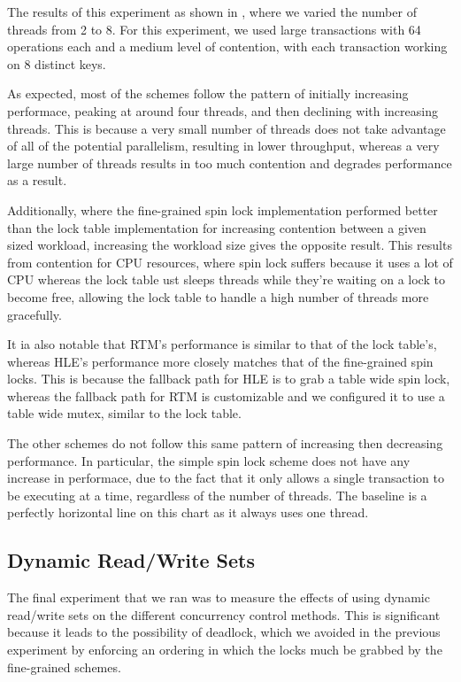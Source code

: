 The results of this experiment as shown in , where we varied the number 
of threads from 2 to 8. For this experiment, we used large transactions with 64 
operations each and a medium level of contention, with each transaction working on 
8 distinct keys.

As expected, most of the schemes follow the pattern of initially increasing performace, 
peaking at around four threads, and then declining with increasing threads. This is 
because a very small number of threads does not take advantage of all of the potential 
parallelism, resulting in lower throughput, whereas a very large number of threads 
results in too much contention and degrades performance as a result.

Additionally, where the fine-grained spin lock implementation performed better than 
the lock table implementation for increasing contention between a given sized 
workload, increasing the workload size gives the opposite result. This results from 
contention for CPU resources, where spin lock suffers because it uses a lot of CPU 
whereas the lock table ust sleeps threads while they're waiting on a lock to become 
free, allowing the lock table to handle a high number of threads more gracefully.

It ia also notable that RTM's performance is similar to that of the lock table's, 
whereas HLE's performance more closely matches that of the fine-grained spin locks. 
This is because the fallback path for HLE is to grab a table wide spin lock, whereas 
the fallback path for RTM is customizable and we configured it to use a table wide 
mutex, similar to the lock table.

The other schemes do not follow this same pattern of increasing then decreasing 
performance. In particular, the simple spin lock scheme does not have any increase 
in performace, due to the fact that it only allows a single transaction to be 
executing at a time, regardless of the number of threads. The baseline is a 
perfectly horizontal line on this chart as it always uses one thread.

\subsection{Dynamic Read/Write Sets}

The final experiment that we ran was to measure the effects of using dynamic 
read/write sets on the different concurrency control methods. This is 
significant because it leads to the possibility of deadlock, which we avoided 
in the previous experiment by enforcing an ordering in which the locks much 
be grabbed by the fine-grained schemes.

